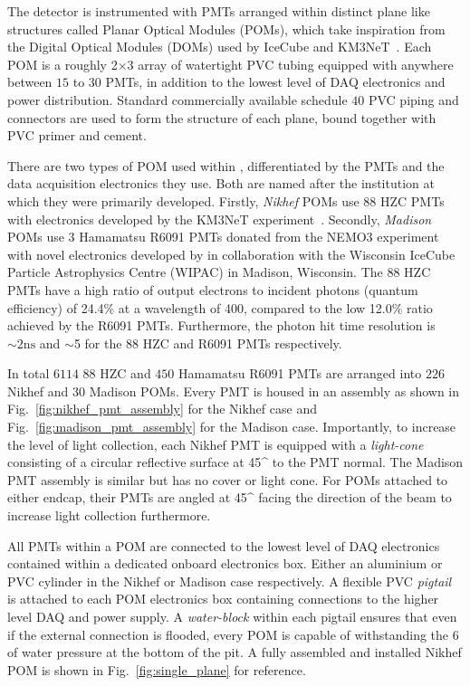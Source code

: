 The \chipsfive detector is instrumented with PMTs arranged within distinct plane like structures
called Planar Optical Modules (POMs), which take inspiration from the Digital Optical Modules
(DOMs) used by IceCube and KM3NeT~\cite{hanson2006, eijk2015}. Each POM is a roughly
\unit{2}{}$\times$\unit{3}{} array of watertight PVC tubing equipped with
anywhere between $15$ to $30$ PMTs, in addition to the lowest level of DAQ electronics and power
distribution. Standard commercially available schedule $40$ PVC piping and connectors are used to
form the structure of each plane, bound together with PVC primer and cement.

There are two types of POM used within \chipsfive, differentiated by the PMTs and the data
acquisition electronics they use. Both are named after the institution at which they were
primarily developed. Firstly, \emph{Nikhef} POMs use \unit{88}{} HZC PMTs with
electronics developed by the KM3NeT experiment~\cite{katz2009, adrian2016}. Secondly,
\emph{Madison} POMs use \unit{3}{} Hamamatsu R6091 PMTs donated from the NEMO3
experiment~\cite{arnold2005} with novel electronics developed by \chips in collaboration with the
Wisconsin IceCube Particle Astrophysics Centre (WIPAC) in Madison, Wisconsin. The
\unit{88}{} HZC PMTs have a high ratio of output electrons to incident photons (quantum
efficiency) of 24.4\% at a wavelength of \unit{400}{}, compared to the low 12.0\% ratio
achieved by the R6091 PMTs. Furthermore, the photon hit time resolution is $\sim2\mathrm{ns}$ and
$\sim$\unit{5}{} for the \unit{88}{} HZC and R6091 PMTs respectively.

In total $6114$ \unit{88}{} HZC and $450$ Hamamatsu R6091 PMTs are arranged into $226$
Nikhef and $30$ Madison POMs. Every PMT is housed in an assembly as shown in
Fig.~\ref{fig:nikhef_pmt_assembly} for the Nikhef case and Fig.~\ref{fig:madison_pmt_assembly} for
the Madison case. Importantly, to increase the level of light collection, each Nikhef PMT is
equipped with a \emph{light-cone} consisting of a circular reflective surface at \unit{45}{^\circ}
to the PMT normal. The Madison PMT assembly is similar but has no cover or light cone. For POMs
attached to either endcap, their PMTs are angled at \unit{45}{^\circ} facing the direction of the
beam to increase light collection furthermore.

All PMTs within a POM are connected to the lowest level of DAQ electronics contained within a
dedicated onboard electronics box. Either an aluminium or PVC cylinder in the Nikhef or Madison
case respectively. A flexible PVC \emph{pigtail} is attached to each POM electronics box
containing connections to the higher level DAQ and power supply. A \emph{water-block} within each
pigtail ensures that even if the external connection is flooded, every POM is capable of
withstanding the \unit{6}{} of water pressure at the bottom of the pit. A fully
assembled and installed Nikhef POM is shown in Fig.~\ref{fig:single_plane} for reference.

